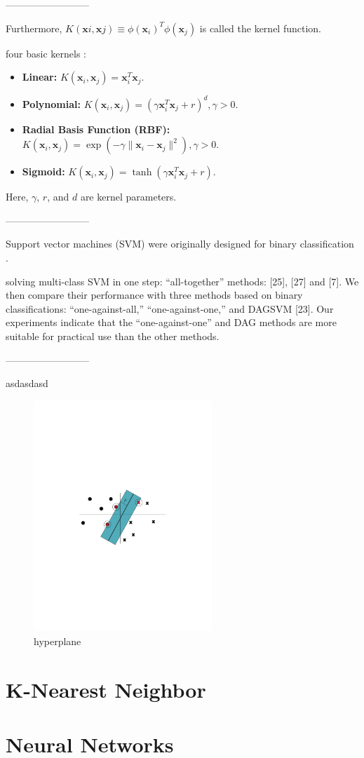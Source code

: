 --------------------------

Furthermore, $K(\bm{x}i, \bm{x}j ) \equiv \phi(\bm{x}_i)^T \phi(\bm{x}_j)$ is called the kernel function.

four basic kernels \cite{hsu2003practical}:

\begin{itemize}
\item \textbf{Linear:} $K(\bm{x}_i,\bm{x}_j) = \bm{x}^T_i \bm{x}_j$.
\item \textbf{Polynomial:} $K(\bm{x}_i,\bm{x}_j) = (\gamma \bm{x}^T_i \bm{x}_j + r)^d, \gamma > 0$.
\item \textbf{Radial Basis Function (RBF):} $K(\bm{x}_i,\bm{x}_j) = \exp(−\gamma \lVert \bm{x}_i − \bm{x}_j \rVert ^2),\gamma > 0$.
\item \textbf{Sigmoid:} $K(\bm{x}_i,\bm{x}_j) = \tanh(\gamma \bm{x}^T_i\bm{x}_j + r)$.
\end{itemize}

Here, $\gamma$, $r$, and $d$ are kernel parameters.

--------------------------

Support vector machines (SVM) were originally designed for binary classification \cite{hsu2002comparison}.

solving multi-class SVM in one step: “all-together” methods: [25], [27] and [7]. We then compare their performance with three methods based on binary classifications: “one-against-all,” “one-against-one,” and DAGSVM [23]. Our experiments indicate that the “one-against-one” and DAG methods are more suitable for practical use than the other methods. 

--------------------------

asdasdasd \cite{berwick2003idiot}

\begin{figure}[!htp]
  \center
  \includegraphics[width=0.6\textwidth]{figures/hyperplane}
  \caption{hyperplane}
  \label{fig:hyperplane}
\end{figure}

\section{K-Nearest Neighbor}

\section{Neural Networks}
